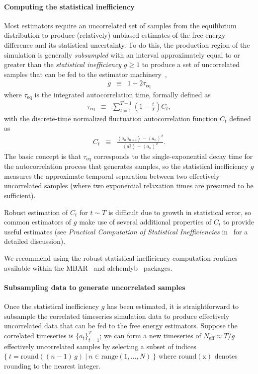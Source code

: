 \documentclass[9pt,bestpractices,pubversion]{livecoms}
\newcommand{\expect}[1]{\left\langle{#1}\right\rangle}
\begin{document}
\paragraph{Computing the statistical inefficiency}
Most estimators require an uncorrelated set of samples from the equilibrium distribution to produce (relatively) unbiased estimates of the free energy difference and its statistical uncertainty.
To do this, the production region of the simulation is generally \emph{subsampled} with an interval approximately equal to or greater than the \emph{statistical inefficiency} $g \ge 1$ to produce a set of uncorrelated samples that can be fed to the estimator machinery~\cite{chodera2016simple},
\begin{eqnarray}
g &\equiv& 1 + 2 \tau_\mathrm{eq} \label{eq:statistical-inefficiency-definition}
\end{eqnarray}
where $\tau_\mathrm{eq}$ is the integrated autocorrelation time, formally defined as
\begin{eqnarray}
\tau_\mathrm{eq} &\equiv& \sum_{t=1}^{T-1} \left(1 - \frac{t}{T}\right) C_t \label{eq:integrated-autocorrelation-time-definition} , 
\end{eqnarray}
with the discrete-time normalized fluctuation autocorrelation function $C_t$ defined as
\begin{eqnarray}
C_t &\equiv& \frac{\expect{a_n a_{n+t}} - \expect{a_n}^2}{\expect{a_n^2} - \expect{a_n}^2} . \label{equation:autocorrelation-definition}
\end{eqnarray}
The basic concept is that $\tau_\mathrm{eq}$ corresponds to the single-exponential decay time for the autocorrelation process that generates samples, so the statistical inefficiency $g$ measures the approximate temporal separation between two effectively uncorrelated samples (where two exponential relaxation times are presumed to be sufficient).

Robust estimation of $C_t$ for $t \sim T$ is difficult due to growth in statistical error, so common estimators of $g$ make use of several additional properties of $C_t$ to provide useful estimates (see \emph{Practical Computation of Statistical Inefficiencies} in~\cite{chodera2016simple} for a detailed discussion).

We recommend using the robust statistical inefficiency computation routines available within the MBAR~\cite{kylebeauchamp2019choderalab} and alchemlyb~\cite{daviddotson2019alchemistry} packages.

\paragraph{Subsampling data to generate uncorrelated samples}
Once the statistical inefficiency $g$ has been estimated, it is straightforward to subsample the correlated timeseries simulation data to produce effectively uncorrelated data that can be fed to the free energy estimators.
Suppose the correlated timeseries is $\{a_t\}_{t=1}^T$; we can form a new timeseries of $N_{\mathrm{eff}} \approx T / g$ effectively uncorrelated samples by selecting a subset of indices $\{ \: t = \mathrm{round}((n-1) \, g) \: | \: n \in \mathrm{range}(1,\ldots ,N) \: \}$ where $\mathrm{round(x)}$ denotes rounding to the nearest integer.
\end{document}
